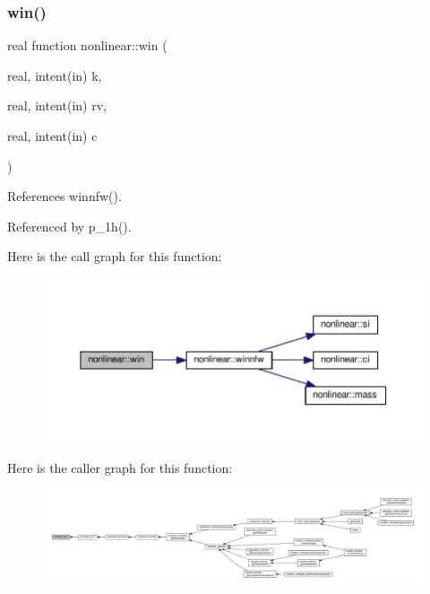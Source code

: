 \subsubsection{\texorpdfstring{win()}{win()}}
{\footnotesize\ttfamily real function nonlinear\+::win (\begin{DoxyParamCaption}\item[{real, intent(in)}]{k,  }\item[{real, intent(in)}]{rv,  }\item[{real, intent(in)}]{c }\end{DoxyParamCaption})\hspace{0.3cm}{\ttfamily [private]}}



References winnfw().



Referenced by p\+\_\+1h().

Here is the call graph for this function\+:
\nopagebreak
\begin{figure}[H]
\begin{center}
\leavevmode
\includegraphics[width=350pt]{namespacenonlinear_a35d90b214ebbc4ed47ee2a0b00533081_cgraph}
\end{center}
\end{figure}
Here is the caller graph for this function\+:
\nopagebreak
\begin{figure}[H]
\begin{center}
\leavevmode
\includegraphics[width=350pt]{namespacenonlinear_a35d90b214ebbc4ed47ee2a0b00533081_icgraph}
\end{center}
\end{figure}
\mbox{\label{namespacenonlinear_ad0e2241407de1974edb07a5990f12ba3}} 
